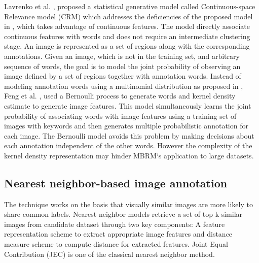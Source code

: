 \documentclass[conference]{IEEEtran}
\begin{document}
		Lavrenko et al. \cite{b4}, proposed a statistical generative model called Continuous-space
Relevance model (CRM) which addresses the deficiencies of the proposed model in \cite{b3},
which takes advantage of continuous features. The model directly associate continuous
features with words and does not require an intermediate clustering stage. An image is
represented as a set of regions along with the corresponding annotations. Given an image,
which is not in the training set, and arbitrary sequence of words, the goal is to model the
joint probability of observing an image defined by a set of regions together with annotation
words. Instead of modeling annotation words using a multinomial distribution as proposed in \cite{b4}, Feng et al. \cite{b5}, used a Bernoulli process to generate words and kernel
density estimate to generate image features. This model simultaneously learns the joint
probability of associating words with image features using a training set of images with
keywords and then generates multiple probabilistic annotation for each image. The Bernoulli
model avoids this problem by making decisions about each annotation independent of
the other words. However the complexity of the kernel density representation may hinder
MBRM‘s application to large datasets.
		

	\subsection{Nearest neighbor-based image annotation}
		The technique works on the basis that visually similar images are more likely to share
common labels. Nearest neighbor models retrieve a set of top k similar images from
candidate dataset through two key components: A feature representation scheme to
extract appropriate image features and distance measure scheme to compute distance for
extracted features. Joint Equal Contribution (JEC)\cite{b6} is one of the classical nearest neighbor method.\\
		
\end{document}
